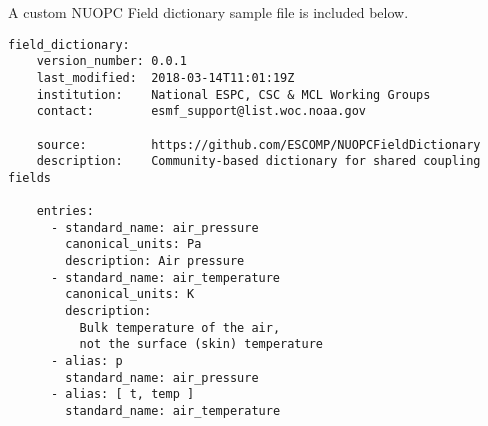 A custom NUOPC Field dictionary sample file is included below.

\begin{verbatim}
field_dictionary:
    version_number: 0.0.1
    last_modified:  2018-03-14T11:01:19Z
    institution:    National ESPC, CSC & MCL Working Groups
    contact:        esmf_support@list.woc.noaa.gov

    source:         https://github.com/ESCOMP/NUOPCFieldDictionary
    description:    Community-based dictionary for shared coupling fields

    entries:
      - standard_name: air_pressure
        canonical_units: Pa
        description: Air pressure
      - standard_name: air_temperature
        canonical_units: K
        description:
          Bulk temperature of the air,
          not the surface (skin) temperature
      - alias: p
        standard_name: air_pressure
      - alias: [ t, temp ]
        standard_name: air_temperature
\end{verbatim}
